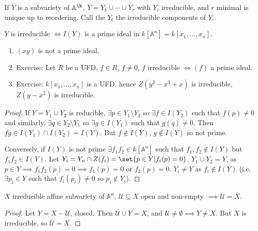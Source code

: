 \documentclass{article}
\newcommand{\A}{\mathbb{A}}
\begin{document}
\begin{ex}
    If $Y$ is a subvariety of $\A^\N$, $Y = Y_1 \cup \dotsb \cup Y_r$ with $Y_i$ irreducible, and $r$ minimal is unique up to reordering. Call the $Y_l$ the irreducible components of $Y$.
\end{ex}
\begin{prop}
    $Y$ is irreducible $\iff I(Y)$ is a prime ideal in $k[\A^n] = k[x_1, \dotsc, x_n]$.
\end{prop}
\begin{eg}
    \begin{enumerate}[label=(\roman*)]
        \item $(x y)$ is not a prime ideal.
        \item Exercise: Let $R$ be a UFD, $f \in R$, $f \neq 0$, $f$ irreducible $\iff (f)$ a prime ideal.
        \item Exercise: $k[x_1, \dotsc, x_n]$ is a UFD.
            hence $Z(y^2 - x^3 + x)$ is irreducible, $Z(y-x^2)$ is irreducible.
    \end{enumerate}
\end{eg}
\begin{proof}
    If $Y = Y_1 \cup Y_2$ is reducible, $\exists p \in Y_1 \setminus Y_2$ so $\exists f \in I(Y_2)$ such that $f(p) \neq 0$ and similarly, $\exists q \in Y_2 \setminus Y_1$ so $\exists g \in I(Y_1)$ such that $g(q) \neq 0$.
    Then $fg \in I(Y_1) \cap I(Y_2) = I(Y)$. But $f \notin I(Y)$, $g \notin I(Y)$ so not prime.
    \begin{center}
    \end{center}

    Conversely, if $I(Y)$ is not prime $\exists f_1 f_2 \in k[\A^n]$ such that $f_1, f_2 \notin I(Y)$ but $f_1 f_2 \in I(Y)$.
    Let $Y_i = Y_n \cap Z(f_i) = \set{p \in Y | f_i(p) = 0}$. $Y_1 \cup Y_2 = Y$, as $p \in Y \implies f_1 f_2 (p) = 0 \implies f_1(p) = 0$ or $f_2(p) = 0$.
    $Y_i \neq Y$ as $f_i \notin I(Y)$ (i.e. $\exists p_l \in Y$ such that $f_i(p_i) \neq 0$ so $p_i \notin Y_i$).
\end{proof}
\begin{lemma}
    $X$ irreducible affine subvariety of $\A^n$, $\mathcal{U} \subseteq X$ open and non-empty $\implies \overline{\mathcal{U}} = X$.
\end{lemma}
\begin{proof}
    Let $Y = X - \mathcal{U}$, closed. Then $\overline{\mathcal{U}} \cup Y = X$, and $\mathcal{U} \neq \emptyset \implies Y \neq X$. But $X$ is irreducible, so $\overline{\mathcal{U}} = X$.
\end{proof}
\end{document}
